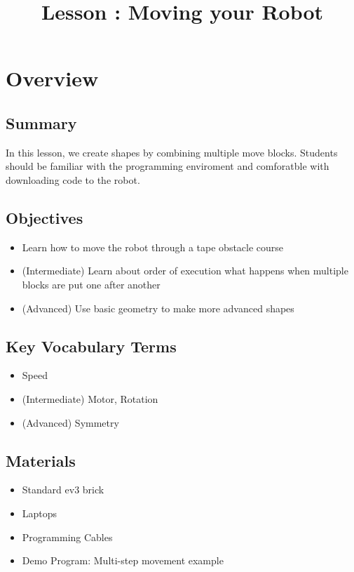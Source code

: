 \documentclass{lessonplan}
\title{Lesson \lessonNumber: Moving your Robot}
\author{\linkHome}
\date{}
\begin{document}
  \maketitle


  \section{Overview}
    \subsection{Summary}
      In this lesson, we create shapes by combining multiple move blocks. Students should be familiar with the programming enviroment and comforatble with downloading code to the robot. 
      
    \subsection{Objectives}
    \begin{itemize}
     \item Learn how to move the robot through a tape obstacle course  
      \item (Intermediate) Learn about order of execution what happens when multiple blocks are put one after another
      \item (Advanced) Use basic geometry to make more advanced shapes
    \end{itemize}
    \subsection{Key Vocabulary Terms}
    \begin{itemize}
      \item Speed
      \item (Intermediate) Motor, Rotation
        \item (Advanced) Symmetry

    \end{itemize}
    \subsection{Materials}
      \begin{itemize}
        \item Standard ev3 brick
        \item Laptops
        \item Programming Cables
        \item Demo Program: Multi-step movement example
      \end{itemize}
      
\end{document}
